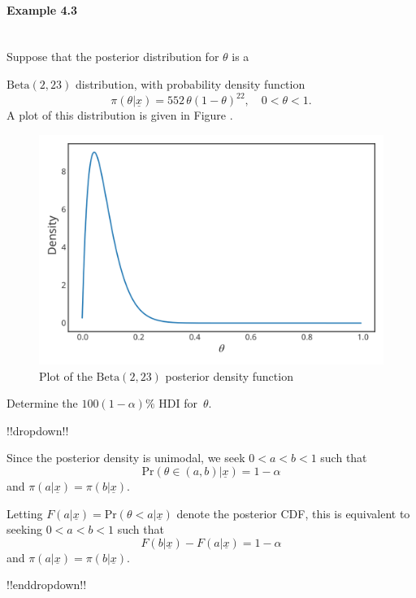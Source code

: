 \paragraph{Example 4.3}{~\\
Suppose that the posterior distribution for $\theta$ is a

$\mathrm{Beta}(2,23)$ distribution, with probability density function
$$
\pi(\theta|\underline{x})=552\,\theta(1-\theta)^{22}, \quad 0<\theta<1.
$$
A plot of this distribution is given in Figure .
\begin{figure}[h!]

\includegraphics{images/betaposterior2.svg}
\caption{Plot of the $\mathrm{Beta}(2,23)$ posterior density function}
\label{fig:ci2}

\end{figure}
Determine the $100(1-\alpha)\%$ HDI for~$\theta$.

!!dropdown!!

Since the posterior density is unimodal, we seek $ 0 < a < b < 1 $ such that
    $$ \mathrm{Pr}(\theta \in (a,b)|\underline{x}) = 1 - \alpha $$
    and $\pi(a|\underline{x}) = \pi(b|\underline{x})$.
    
    Letting $F(a|\underline{x}) = \mathrm{Pr}(\theta < a|\underline{x})$ denote the posterior CDF, this is equivalent to  seeking $0<a<b<1$ such that
    $$ F(b|\underline{x}) - F(a|\underline{x}) = 1 - \alpha$$
    and $\pi(a|\underline{x}) = \pi(b|\underline{x})$.

!!enddropdown!!
\clearpage

}
